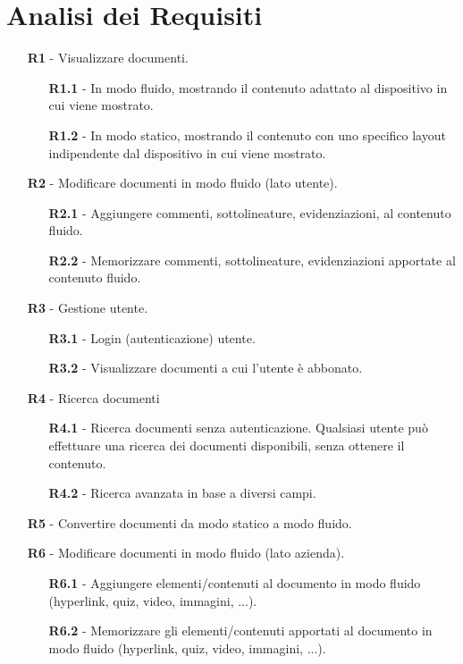 \section{Analisi dei Requisiti}
\begin{itemize}
    \item[\textbf{R1}] - Visualizzare documenti.
    \begin{itemize}
        \item[\textbf{R1.1}] - In modo fluido, mostrando il contenuto adattato al dispositivo in cui viene mostrato.
        \item[\textbf{R1.2}] - In modo statico, mostrando il contenuto con uno specifico layout indipendente dal dispositivo in cui viene mostrato.
    \end{itemize}
    \item[\textbf{R2}] - Modificare documenti in modo fluido (lato utente).
    \begin{itemize}
        \item[\textbf{R2.1}] - Aggiungere commenti, sottolineature, evidenziazioni, al contenuto fluido.
        \item[\textbf{R2.2}] - Memorizzare commenti, sottolineature, evidenziazioni apportate al contenuto fluido.
    \end{itemize}
    \item[\textbf{R3}] - Gestione utente.
    \begin{itemize}
        \item[\textbf{R3.1}] - Login (autenticazione) utente.
        \item[\textbf{R3.2}] - Visualizzare documenti a cui l'utente è abbonato.
    \end{itemize}
    \item[\textbf{R4}] - Ricerca documenti
    \begin{itemize}
        \item[\textbf{R4.1}] - Ricerca documenti senza autenticazione. Qualsiasi utente può effettuare una ricerca dei documenti disponibili, senza ottenere il contenuto.
        \item[\textbf{R4.2}] - Ricerca avanzata in base a diversi campi. %
    \end{itemize}
    \item[\textbf{R5}] - Convertire documenti da modo statico a modo fluido.
    \item[\textbf{R6}] - Modificare documenti in modo fluido (lato azienda).
    \begin{itemize}
        \item[\textbf{R6.1}] - Aggiungere elementi/contenuti al documento in modo fluido (hyperlink, quiz, video, immagini, ...). %
        \item[\textbf{R6.2}] - Memorizzare gli elementi/contenuti apportati al documento in modo fluido (hyperlink, quiz, video, immagini, ...).
    \end{itemize}
\end{itemize}


